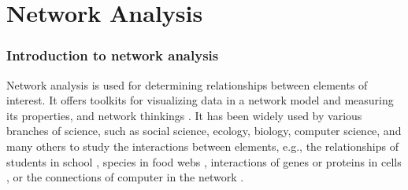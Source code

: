 \section*{Network Analysis}
\subsubsection{Introduction to network analysis}
Network analysis is used for determining relationships between elements of interest. It offers toolkits for visualizing data in a network model and measuring its properties, and network thinkings . It has been widely used by various branches of science, such as social science, ecology, biology, computer science, and many others to study the interactions between elements, e.g., the relationships of students in school , species in food webs , interactions of genes or proteins in cells , or the connections of computer in the network .

